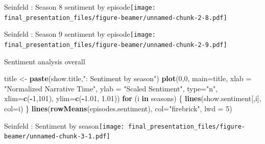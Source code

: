 \documentclass[
  ignorenonframetext,
]{beamer}
\newenvironment{Shaded}{\begin{snugshade}}{\end{snugshade}}
\newcommand{\ControlFlowTok}[1]{\textcolor[rgb]{0.13,0.29,0.53}{\textbf{#1}}}
\newcommand{\DataTypeTok}[1]{\textcolor[rgb]{0.13,0.29,0.53}{#1}}
\newcommand{\DecValTok}[1]{\textcolor[rgb]{0.00,0.00,0.81}{#1}}
\newcommand{\FloatTok}[1]{\textcolor[rgb]{0.00,0.00,0.81}{#1}}
\newcommand{\KeywordTok}[1]{\textcolor[rgb]{0.13,0.29,0.53}{\textbf{#1}}}
\newcommand{\NormalTok}[1]{#1}
\newcommand{\OperatorTok}[1]{\textcolor[rgb]{0.81,0.36,0.00}{\textbf{#1}}}
\newcommand{\StringTok}[1]{\textcolor[rgb]{0.31,0.60,0.02}{#1}}
\begin{document}
\begin{frame}{Seinfeld : Season 8 sentiment by
episode\texttt{[image: final\_presentation\_files/figure-beamer/unnamed-chunk-2-8.pdf]}}
\protect\hypertarget{seinfeld-season-8-sentiment-by-episode}{}

\end{frame}

\begin{frame}{Seinfeld : Season 9 sentiment by
episode\texttt{[image: final\_presentation\_files/figure-beamer/unnamed-chunk-2-9.pdf]}}
\protect\hypertarget{seinfeld-season-9-sentiment-by-episode}{}

\end{frame}

\begin{frame}[fragile]{Sentiment analysis overall}
\protect\hypertarget{sentiment-analysis-overall}{}

\begin{Shaded}
\begin{Highlighting}[]
\NormalTok{title <-}\StringTok{ }\KeywordTok{paste}\NormalTok{(show.title,}\StringTok{": Sentiment by season"}\NormalTok{)}
\KeywordTok{plot}\NormalTok{(}\DecValTok{0}\NormalTok{,}\DecValTok{0}\NormalTok{, }\DataTypeTok{main=}\NormalTok{title, }\DataTypeTok{xlab =} \StringTok{"Normalized Narrative Time"}\NormalTok{, }\DataTypeTok{ylab =} \StringTok{"Scaled Sentiment"}\NormalTok{, }\DataTypeTok{type=}\StringTok{"n"}\NormalTok{, }\DataTypeTok{xlim=}\KeywordTok{c}\NormalTok{(}\OperatorTok{-}\DecValTok{1}\NormalTok{,}\DecValTok{101}\NormalTok{), }\DataTypeTok{ylim=}\KeywordTok{c}\NormalTok{(}\OperatorTok{-}\FloatTok{1.01}\NormalTok{, }\FloatTok{1.01}\NormalTok{))}
\ControlFlowTok{for}\NormalTok{ (i }\ControlFlowTok{in}\NormalTok{ seasons) \{}
  \KeywordTok{lines}\NormalTok{(show.sentiment[,i], }\DataTypeTok{col=}\NormalTok{i)}
\NormalTok{\}}
\KeywordTok{lines}\NormalTok{(}\KeywordTok{rowMeans}\NormalTok{(episodes.sentiment), }\DataTypeTok{col=}\StringTok{"firebrick"}\NormalTok{, }\DataTypeTok{lwd =} \DecValTok{5}\NormalTok{)}
\end{Highlighting}
\end{Shaded}

\end{frame}

\begin{frame}{Seinfeld : Sentiment by
season\texttt{[image: final\_presentation\_files/figure-beamer/unnamed-chunk-3-1.pdf]}}
\protect\hypertarget{seinfeld-sentiment-by-season}{}

\end{frame}
\end{document}
